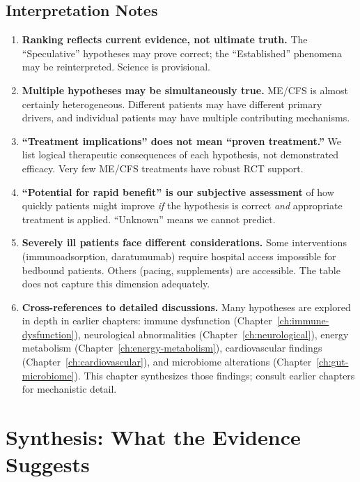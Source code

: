\subsection{Interpretation Notes}

\begin{enumerate}
    \item \textbf{Ranking reflects current evidence, not ultimate truth.} The ``Speculative'' hypotheses may prove correct; the ``Established'' phenomena may be reinterpreted. Science is provisional.

    \item \textbf{Multiple hypotheses may be simultaneously true.} ME/CFS is almost certainly heterogeneous. Different patients may have different primary drivers, and individual patients may have multiple contributing mechanisms.

    \item \textbf{``Treatment implications'' does not mean ``proven treatment.''} We list logical therapeutic consequences of each hypothesis, not demonstrated efficacy. Very few ME/CFS treatments have robust RCT support.

    \item \textbf{``Potential for rapid benefit'' is our subjective assessment} of how quickly patients might improve \textit{if} the hypothesis is correct \textit{and} appropriate treatment is applied. ``Unknown'' means we cannot predict.

    \item \textbf{Severely ill patients face different considerations.} Some interventions (immunoadsorption, daratumumab) require hospital access impossible for bedbound patients. Others (pacing, supplements) are accessible. The table does not capture this dimension adequately.

    \item \textbf{Cross-references to detailed discussions.} Many hypotheses are explored in depth in earlier chapters: immune dysfunction (Chapter~\ref{ch:immune-dysfunction}), neurological abnormalities (Chapter~\ref{ch:neurological}), energy metabolism (Chapter~\ref{ch:energy-metabolism}), cardiovascular findings (Chapter~\ref{ch:cardiovascular}), and microbiome alterations (Chapter~\ref{ch:gut-microbiome}). This chapter synthesizes those findings; consult earlier chapters for mechanistic detail.
\end{enumerate}


\section{Synthesis: What the Evidence Suggests}
\label{sec:synthesis}

